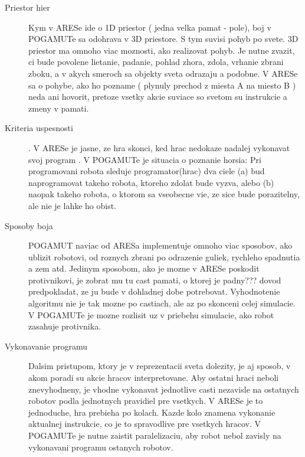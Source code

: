 \documentclass[a4paper,11pt,final]{report}
\begin{document}
\begin{description}
\item[Priestor hier] Kym v ARESe ide o 1D priestor ( jedna velka pamat - pole), boj v POGAMUTe sa odohrava v 3D priestore. S tym suvisi pohyb po svete. 3D priestor ma omnoho viac moznosti, ako realizovat pohyb. Je nutne zvazit, ci bude povolene lietanie, padanie, pohlad zhora, zdola, vrhanie zbrani zboku, a v akych smeroch sa objekty sveta odrazaju a podobne. V ARESe sa o pohybe, ako ho pozname ( plynuly prechod z miesta A na miesto B ) neda ani hovorit, pretoze vsetky akcie suviace so svetom su instrukcie a zmeny v pamati. 
\item[Kriteria uspesnosti]. V ARESe je jasne, ze hra skonci, ked hrac nedokaze nadalej vykonavat svoj program . V POGAMUTe je situacia o poznanie horsia: Pri programovani robota sleduje programator(hrac) dva ciele (a) bud naprogramovat takeho robota, ktoreho zdolat bude vyzva, alebo (b) naopak takeho robota, o ktorom sa vseobecne vie, ze sice bude porazitelny, ale nie je lahke ho obist.
\item[Sposoby boja]
POGAMUT naviac od ARESa implementuje omnoho viac sposobov, ako ublizit robotovi, od roznych zbrani po odrazenie guliek, rychleho spadnutia a zem atd. Jedinym sposobom, ako je mozne v ARESe poskodit protivnikovi, je zobrat mu tu cast pamati, o ktorej je padny??? dovod predpokladat, ze ju bude v dohladnej dobe potrebovat. Vyhodnotenie algoritmu nie je tak mozne po castiach, ale az po skonceni celej simulacie. V POGAMUTe je mozne rozlisit  uz v priebehu simulacie, ako robot zasahuje protivnika.
\item [Vykonavanie programu] Dalsim pristupom, ktory je v reprezentacii sveta dolezity, je aj sposob, v akom poradi su akcie hracov interpretovane. Aby ostatni hraci neboli znevyhodneny, je vhodne vykonavat jednotlive casti nezavisle na ostatnych robotov podla jednotnych pravidiel pre vsetkych. V ARESe je to jednoduche, hra prebieha po kolach. Kazde kolo znamena vykonanie aktualnej instrukcie, co je to spravodlive pre vsetkych hracov. V POGAMUTe je nutne zaistit paralelizaciu, aby robot nebol zavisly na vykonavani programu ostanych robotov.
\end{description}
\end{document}
